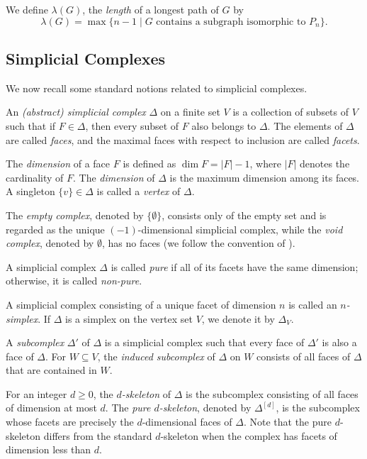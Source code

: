 \documentclass[12pt,reqno]{amsart}
\theoremstyle{definition}
\begin{document}
We define $\lambda(G)$, the \emph{length} of a longest path of $G$ by
\[
\lambda(G) =
\max \{n-1 \mid \text{$G$ contains a subgraph isomorphic to $P_n$}\}.
\]

\subsection{Simplicial Complexes}

We now recall some standard notions related to simplicial complexes.

\medskip

An \emph{(abstract) simplicial complex} $\Delta$ on a finite set $V$ is a collection of subsets of $V$ such that if $F\in \Delta$, then every subset of $F$ also belongs to $\Delta$. The elements of $\Delta$ are called \emph{faces}, and the maximal faces with respect to inclusion are called \emph{facets}. 

The \emph{dimension} of a face $F$ is defined as $\dim F = |F|-1$, where $|F|$ denotes the cardinality of $F$. The \emph{dimension} of $\Delta$ is the maximum dimension among its faces. A singleton $\{v\}\in \Delta$ is called a \emph{vertex} of $\Delta$.

The \emph{empty complex}, denoted by $\{\emptyset\}$, consists only of the empty set and is regarded as the unique $(-1)$-dimensional simplicial complex, while the \emph{void complex}, denoted by $\emptyset$, has no faces (we follow the convention of \cite{kozlov2007}).

A simplicial complex $\Delta$ is called \emph{pure} if all of its facets have the same dimension; otherwise, it is called \emph{non-pure}.

A simplicial complex consisting of a unique facet of dimension $n$ is called an \emph{$n$-simplex}. If $\Delta$ is a simplex on the vertex set $V$, we denote it by $\Delta_V$. 

\medskip

A \emph{subcomplex} $\Delta'$ of $\Delta$ is a simplicial complex such that every face of $\Delta'$ is also a face of $\Delta$. For $W\subseteq V$, the \emph{induced subcomplex} of $\Delta$ on $W$ consists of all faces of $\Delta$ that are contained in $W$.

For an integer $d\ge 0$, the \emph{$d$-skeleton} of $\Delta$ is the subcomplex consisting of all faces of dimension at most $d$. 
The \emph{pure $d$-skeleton}, denoted by $\Delta^{[d]}$, is the subcomplex whose facets are precisely the $d$-dimensional faces of $\Delta$.
Note that the pure $d$-skeleton differs from the standard $d$-skeleton when the complex has facets of dimension less than $d$. 
\medskip
\end{document}
